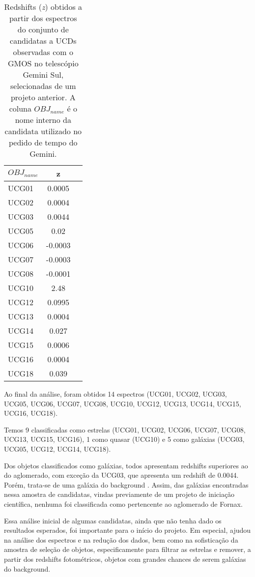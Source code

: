 \begin{table}[!ht]
    \centering
    \caption{Redshifts (\textit{z}) obtidos a partir dos espectros do conjunto de candidatas a UCDs observadas com o GMOS no telescópio Gemini Sul, selecionadas de um projeto anterior. A coluna $OBJ_{name}$ é o nome interno da candidata utilizado no pedido de tempo do Gemini.} 
    \begin{tabular}{lcc}
        \toprule
        $OBJ_{name}$ & z   \\
        \midrule
        UCG01     & 0.0005 \\
        UCG02     & 0.0004 \\
        UCG03     & 0.0044 \\
        UCG05     & 0.02 \\
        UCG06     & -0.0003 \\
        UCG07     & -0.0003 \\
        UCG08     & -0.0001 \\
        UCG10     & 2.48 \\
        UCG12     & 0.0995 \\
        UCG13     & 0.0004 \\
        UCG14     & 0.027 \\
        UCG15     & 0.0006 \\
        UCG16     & 0.0004 \\
        UCG18     & 0.039 \\
        \bottomrule
    \end{tabular}
    \label{redshift_candidatas_1}
\end{table}


Ao final da análise, foram obtidos 14 espectros (UCG01, UCG02, UCG03, UCG05, UCG06, UCG07, UCG08, UCG10, UCG12, UCG13, UCG14, UCG15, UCG16, UCG18).

Temos 9 classificadas como estrelas (UCG01, UCG02, UCG06, UCG07, UCG08, UCG13, UCG15, UCG16), 1 como quasar (UCG10) e 5 como galáxias (UCG03, UCG05, UCG12, UCG14, UCG18).

Dos objetos classificados como galáxias, todos apresentam redshifts superiores ao do aglomerado, com exceção da UCG03, que apresenta um redshift de 0.0044. Porém, trata-se de uma galáxia do background \citep{Maddox_2019}. Assim, das galáxias encontradas nessa amostra de candidatas, vindas previamente de um projeto de iniciação científica, nenhuma foi classificada como pertencente ao aglomerado de Fornax.

Essa análise inicial de algumas candidatas, ainda que não tenha dado os resultados esperados, foi importante para o início do projeto. Em especial, ajudou na análise dos espectros e na redução dos dados, bem como na sofisticação da amostra de seleção de objetos, especificamente para filtrar as estrelas e remover, a partir dos redshifts fotométricos, objetos com grandes chances de serem galáxias do background.

